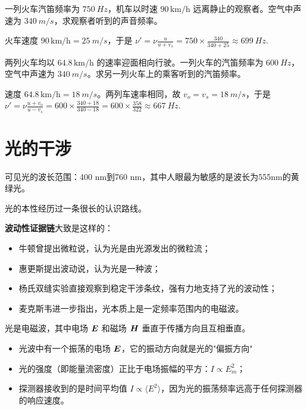 \documentclass[lang=cn,11pt]{elegantbook}
\begin{document}
\begin{exercise}
一列火车汽笛频率为 \(\SI{750}{Hz}\)，机车以时速 \(90\,\mathrm{km/h}\) 远离静止的观察者。空气中声速为 \(\SI{340}{m/s}\)，求观察者听到的声音频率。
\end{exercise}

\begin{solution}
火车速度 \(90\,\mathrm{km/h}=\SI{25}{m/s}\)，于是
 \(\nu'=\nu\frac{u}{u+v_s} =750\times\frac{340}{340+25} \approx \SI{699}{Hz}.\) 
\end{solution}

\begin{exercise}[2015-2016期末：两列相向火车中的汽笛频率]
两列火车均以 \(64.8\,\mathrm{km/h}\) 的速率迎面相向行驶。一列火车的汽笛频率为 \(\SI{600}{Hz}\)，空气中声速为 \(\SI{340}{m/s}\)。求另一列火车上的乘客听到的汽笛频率。
\end{exercise}

\begin{solution}
速度 \(64.8\,\mathrm{km/h}=\SI{18}{m/s}\)。两列车速率相同，故 \(v_o=v_s=\SI{18}{m/s}\)，于是
 \(\nu'=\nu\frac{u+v_o}{u-v_s} =600\times\frac{340+18}{340-18} =600\times\frac{358}{322} \approx\SI{667}{Hz}.\) 
\end{solution}

\chapter{光的干涉}

\begin{definition}[可见光]
可见光的波长范围：400 nm到760 nm，其中人眼最为敏感的是波长为555nm的黄绿光。
\end{definition}

光的本性经历过一条很长的认识路线。

\textbf{波动性证据链}大致是这样的：
\begin{itemize}
 \item 牛顿曾提出微粒说，认为光是由光源发出的微粒流；
 \item 惠更斯提出波动说，认为光是一种波；
 \item 杨氏双缝实验直接观察到稳定干涉条纹，强有力地支持了光的波动性；
 \item 麦克斯韦进一步指出，光本质上是一定频率范围内的电磁波。
\end{itemize}
光是电磁波，其中电场 \(\vb*{E}\) 和磁场 \(\vb*{H}\) 垂直于传播方向且互相垂直。
\begin{itemize}
 \item 光波中有一个振荡的电场 \(\vb*{E}\)，它的振动方向就是光的"偏振方向"
 \item  光的强度（即能量流密度）正比于电场振幅的平方：\(I\propto E_m^2\)；
 \item 探测器接收到的是时间平均值 \(I\propto\langle E^2\rangle\)，因为光的振荡频率远高于任何探测器的响应速度。
\end{itemize}
\end{document}
